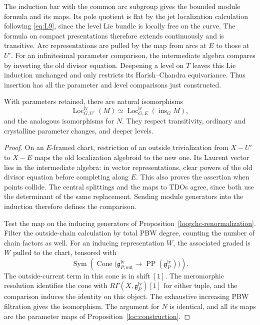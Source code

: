 The induction bar with the common arc subgroup gives the bounded
module formula and its maps.  Its pole quotient is flat by the jet
localization calculation following \eqref{eq:L9}, since the level Lie
bundle is locally free on the curve.  The formula on compact
presentations therefore extends continuously and is transitive.
Arc representations are pulled by the map from arcs at $E$ to those
at $U'$.  For an infinitesimal parameter comparison, the intermediate
algebra compares by inverting the old divisor equation.  Deepening a
level on $T$ leaves this Lie induction unchanged and only restricts
its Harish--Chandra equivariance.  Thus insertion has all the parameter
and level comparisons just constructed.

\begin{proposition}\label{loc:propagation}
With parameters retained, there are natural isomorphisms
\begin{equation}\label{eq:T3}
 \operatorname{Loc}_{G,U'}^{\mathrm{lv}}(M)
 \simeq
 \operatorname{Loc}_{G,E}^{\mathrm{lv}}(
                      \operatorname{ins}_G M),
\end{equation}
and the analogous isomorphisms for $N$.  They respect transitivity,
ordinary and crystalline parameter changes, and deeper levels.
\end{proposition}

\begin{proof}
On an $E$-framed chart, restriction of an outside trivialization from
$X-U'$ to $X-E$ maps the old localization algebroid to the new one.
Its Laurent vector lies in the intermediate algebra: in vector
representations, clear powers of the old divisor equation before
completing along $E$.  This also proves the assertion when points
collide.  The central splittings and the maps to TDOs agree, since
both use the determinant of the same replacement.  Sending module
generators into the induction therefore defines the comparison.

Test the map on the inducing generators of
Proposition~\ref{loop:hc-renormalization}.  Filter the
outside-chain calculation by total PBW degree, counting the number
of chain factors as well.  For an inducing representation $W$, the
associated graded is $W$ pulled to the chart, tensored with
\[
 \operatorname{Sym}\!\left(
  \operatorname{Cone}\bigl(
   \mathfrak g^{\mathrm{lv}}_{P,\mathrm{out}}
     \longrightarrow\operatorname{PP}(
                              \mathfrak g^{\mathrm{lv}}_P)
                     \bigr)\right).
\]
The outside-current term in this cone is in shift $[1]$.
The meromorphic resolution identifies the cone with
$R\Gamma(X,\mathfrak g^{\mathrm{lv}}_P)[1]$ for either tuple,
and the comparison induces the identity on this object.  The
exhaustive increasing PBW filtration gives the isomorphism.  The
argument for $N$ is identical, and all its maps are the parameter
maps of Proposition~\ref{loc:construction}.
\end{proof}

